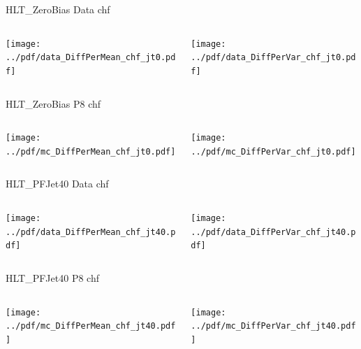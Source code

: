 \documentclass[9pt]{beamer}
\begin{document}
\begin{frame}[t]{HLT\_ZeroBias Data chf}
\begin{columns}[T]
  \begin{column}{.5\textwidth}
  \texttt{[image: ../pdf/data\_DiffPerMean\_chf\_jt0.pdf]}
  \end{column}
  \begin{column}{.5\textwidth}
  \texttt{[image: ../pdf/data\_DiffPerVar\_chf\_jt0.pdf]}
  \end{column}
\end{columns}
\end{frame}

\begin{frame}[t]{HLT\_ZeroBias P8 chf}
\begin{columns}[T]
  \begin{column}{.5\textwidth}
  \texttt{[image: ../pdf/mc\_DiffPerMean\_chf\_jt0.pdf]}
  \end{column}
  \begin{column}{.5\textwidth}
  \texttt{[image: ../pdf/mc\_DiffPerVar\_chf\_jt0.pdf]}
  \end{column}
\end{columns}
\end{frame}

\begin{frame}[t]{HLT\_PFJet40 Data chf}
\begin{columns}[T]
  \begin{column}{.5\textwidth}
  \texttt{[image: ../pdf/data\_DiffPerMean\_chf\_jt40.pdf]}
  \end{column}
  \begin{column}{.5\textwidth}
  \texttt{[image: ../pdf/data\_DiffPerVar\_chf\_jt40.pdf]}
  \end{column}
\end{columns}
\end{frame}

\begin{frame}[t]{HLT\_PFJet40 P8 chf}
\begin{columns}[T]
  \begin{column}{.5\textwidth}
  \texttt{[image: ../pdf/mc\_DiffPerMean\_chf\_jt40.pdf]}
  \end{column}
  \begin{column}{.5\textwidth}
  \texttt{[image: ../pdf/mc\_DiffPerVar\_chf\_jt40.pdf]}
  \end{column}
\end{columns}
\end{frame}
\end{document}
